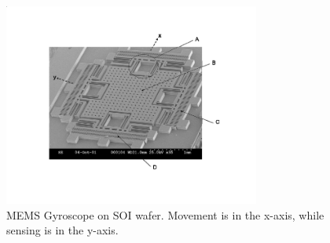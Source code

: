 \documentclass{article}
\begin{document}
\begin{figure}[h]
	\centering
	\vspace{-20pt}
	\includegraphics[keepaspectratio,width=0.75\textwidth]{gyro}
	\vspace{-40pt}
	\caption{MEMS Gyroscope on SOI wafer. Movement is in the x-axis, while sensing is in the y-axis.}
	\label{gyro}
	\vspace{-20pt}
\end{figure}

\label{end}
\end{document}
